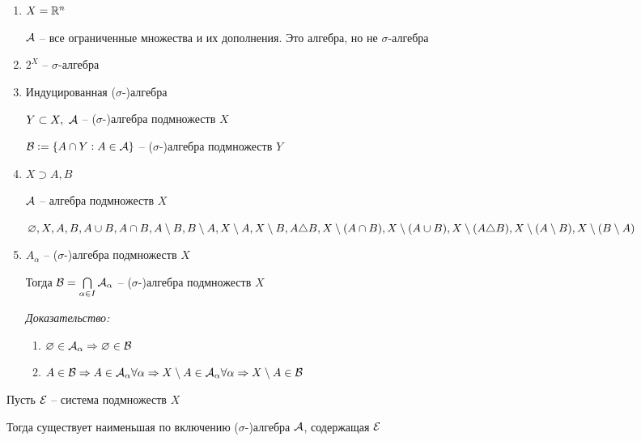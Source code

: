 \documentclass[12pt]{article}
\begin{document}
\begin{Example}{}
    \begin{enumerate}
        \item $X = \mathbb R^n$
        
        $\mathcal{A}$ -- все ограниченные множества и их дополнения. Это алгебра, но не $\sigma$-алгебра

        \item $2^X$ -- $\sigma$-алгебра
        \item Индуцированная ($\sigma$-)алгебра 
        
        $Y \subset X,\ \mathcal{A}$ -- ($\sigma$-)алгебра подмножеств $X$

        $\mathcal{B} := \{A \cap Y : A \in \mathcal{A}\}$ -- ($\sigma$-)алгебра подмножеств $Y$

        \item $X \supset A, B$
        
        $\mathcal{A}$ -- алгебра подмножеств $X$

        $\varnothing, X, A, B, A \cup B, A \cap B, A \setminus B, B \setminus A, X \setminus A, X \setminus B, A \triangle B, X \setminus (A \cap B), X \setminus (A \cup B), \\ X \setminus (A \triangle B), X \setminus (A \setminus B), X \setminus (B \setminus A)$

        \item $A_\alpha$ -- ($\sigma$-)алгебра подмножеств $X$
        
        Тогда $\mathcal{B} = \bigcap\limits_{\alpha \in I} \mathcal{A}_\alpha$ -- ($\sigma$-)алгебра подмножеств $X$

        \textit{Доказательство:}

        \begin{enumerate}
            \item $\varnothing \in \mathcal{A}_\alpha \Rightarrow \varnothing \in \mathcal{B}$
            \item $A \in \mathcal{B} \Rightarrow A \in \mathcal{A}_\alpha \forall \alpha \Rightarrow X \setminus A \in \mathcal{A}_\alpha \forall \alpha \Rightarrow X \setminus A \in \mathcal{B}$
        \end{enumerate}
    \end{enumerate}
\end{Example}

\begin{theo}{}
    Пусть $\mathcal{E}$ -- система подмножеств $X$

    Тогда существует наименьшая по включению ($\sigma$-)алгебра $\mathcal{A}$, содержащая $\mathcal{E}$
\end{theo}
\end{document}
